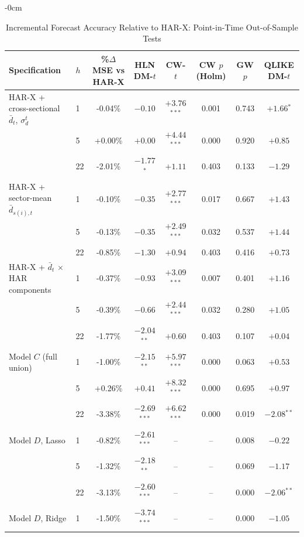 
\begin{table}[htbp]
\begin{adjustwidth}{-\extralength}{0cm}
\centering
\caption{Incremental Forecast Accuracy Relative to HAR-X: Point-in-Time Out-of-Sample Tests}
\label{tab:harx_tests}
\footnotesize
\setlength{\tabcolsep}{4pt}
\begin{tabular}{llcccccc}
\toprule
Specification & $h$ & \%$\Delta$MSE vs HAR-X & HLN DM-$t$ & CW-$t$ & CW $p$ (Holm) & GW $p$ & QLIKE DM-$t$ \\
\midrule
HAR-X + cross-sectional $\bar d_t$, $\sigma_d^t$ & 1 & -0.04\% & $-0.10$ & $+3.76$$^{***}$ & 0.001 & 0.743 & $+1.66$$^{*}$ \\
 & 5 & +0.00\% & $+0.00$ & $+4.44$$^{***}$ & 0.000 & 0.920 & $+0.85$ \\
 & 22 & -2.01\% & $-1.77$$^{*}$ & $+1.11$ & 0.403 & 0.133 & $-1.29$ \\
\midrule
HAR-X + sector-mean $\bar d_{s(i),t}$ & 1 & -0.10\% & $-0.35$ & $+2.77$$^{***}$ & 0.017 & 0.667 & $+1.43$ \\
 & 5 & -0.13\% & $-0.35$ & $+2.49$$^{***}$ & 0.032 & 0.537 & $+1.44$ \\
 & 22 & -0.85\% & $-1.30$ & $+0.94$ & 0.403 & 0.416 & $+0.73$ \\
\midrule
HAR-X + $\bar d_t$ $\times$ HAR components & 1 & -0.37\% & $-0.93$ & $+3.09$$^{***}$ & 0.007 & 0.401 & $+1.16$ \\
 & 5 & -0.39\% & $-0.66$ & $+2.44$$^{***}$ & 0.032 & 0.280 & $+1.05$ \\
 & 22 & -1.77\% & $-2.04$$^{**}$ & $+0.60$ & 0.403 & 0.107 & $+0.04$ \\
\midrule
Model $C$ (full union) & 1 & -1.00\% & $-2.15$$^{**}$ & $+5.97$$^{***}$ & 0.000 & 0.063 & $+0.53$ \\
 & 5 & +0.26\% & $+0.41$ & $+8.32$$^{***}$ & 0.000 & 0.695 & $+0.97$ \\
 & 22 & -3.38\% & $-2.69$$^{***}$ & $+6.62$$^{***}$ & 0.000 & 0.019 & $-2.08$$^{**}$ \\
\midrule
Model $D$, Lasso & 1 & -0.82\% & $-2.61$$^{***}$ & -- & -- & 0.008 & $-0.22$ \\
 & 5 & -1.32\% & $-2.18$$^{**}$ & -- & -- & 0.069 & $-1.17$ \\
 & 22 & -3.13\% & $-2.60$$^{***}$ & -- & -- & 0.000 & $-2.06$$^{**}$ \\
\midrule
Model $D$, Ridge & 1 & -1.50\% & $-3.74$$^{***}$ & -- & -- & 0.000 & $-1.05$ \\

\end{tabular}
\end{adjustwidth}
\end{table}
